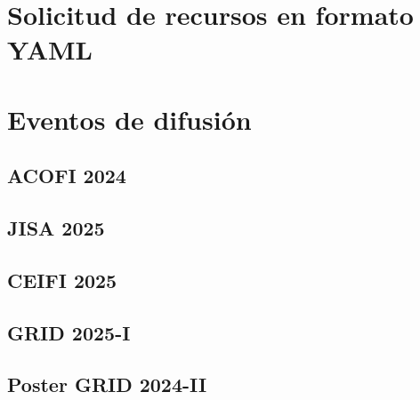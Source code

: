 \FloatBarrier\chapter{Solicitud de recursos en formato YAML}


\FloatBarrier\chapter{Eventos de difusión}

\FloatBarrier\section{ACOFI 2024}


\FloatBarrier\section{JISA 2025}


\FloatBarrier\section{CEIFI 2025}


\FloatBarrier\section{GRID 2025-I }


\FloatBarrier\section{Poster GRID 2024-II}
